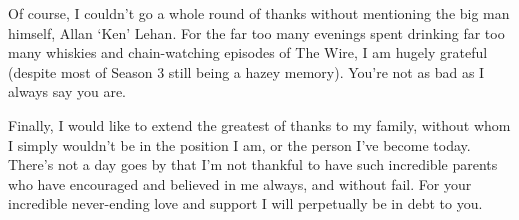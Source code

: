 \begin{acknowledgements}
\begin{spacing}{1}
Of course, I couldn't go a whole round of thanks without mentioning the big man
himself, Allan `Ken' Lehan. For the far too many evenings spent
drinking far too many whiskies and chain-watching episodes of The Wire, I am
hugely grateful (despite most of Season 3 still being a hazey memory). You're
not as bad as I always say you are.

Finally, I would like to extend the greatest of thanks to my family, without whom
I simply wouldn't be in the position I am, or the person I've become today.
There's not a day goes by that I'm not thankful to have such incredible parents
who have encouraged and believed in me always, and without fail.
For your incredible never-ending love and support I will perpetually be in debt
to you.
\end{spacing}

\end{acknowledgements}

